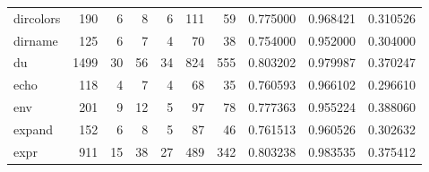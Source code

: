 \begin{longtable}{lrrrrrrrrr}
dircolors &                    190 &                                  6 &                                 8 &                                6 &                               111 &                              59 &                                0.775000 &                               0.968421 &                             0.310526 \\
dirname   &                    125 &                                  6 &                                 7 &                                4 &                                70 &                              38 &                                0.754000 &                               0.952000 &                             0.304000 \\
du        &                   1499 &                                 30 &                                56 &                               34 &                               824 &                             555 &                                0.803202 &                               0.979987 &                             0.370247 \\
echo      &                    118 &                                  4 &                                 7 &                                4 &                                68 &                              35 &                                0.760593 &                               0.966102 &                             0.296610 \\
env       &                    201 &                                  9 &                                12 &                                5 &                                97 &                              78 &                                0.777363 &                               0.955224 &                             0.388060 \\
expand    &                    152 &                                  6 &                                 8 &                                5 &                                87 &                              46 &                                0.761513 &                               0.960526 &                             0.302632 \\
expr      &                    911 &                                 15 &                                38 &                               27 &                               489 &                             342 &                                0.803238 &                               0.983535 &                             0.375412 \\

\end{longtable}
